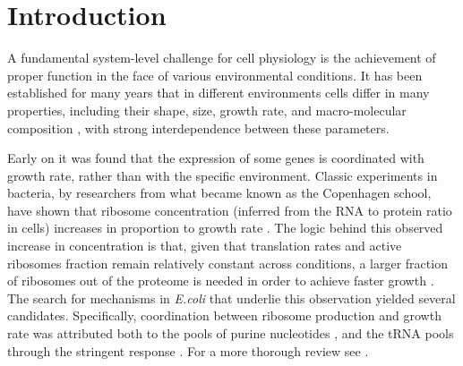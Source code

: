 \section{Introduction}
A fundamental system-level challenge for cell physiology is the achievement of proper function in the face of various environmental conditions.
It has been established for many years that in different environments cells differ in many properties, including their shape, size, growth rate, and macro-molecular composition \cite{Schaechter1958,Maaloe1969,Churchward1982,Pedersen1978a,ingraham1983growth,Bremer1987}, with strong interdependence between these parameters.


Early on it was found that the expression of some genes is coordinated with growth rate, rather than with the specific environment.
Classic experiments in bacteria, by researchers from what became known as the Copenhagen school, have shown that ribosome concentration (inferred from the RNA to protein ratio in cells) increases in proportion to growth rate \cite{Schaechter1958}.
The logic behind this observed increase in concentration is that, given that translation rates and active ribosomes fraction remain relatively constant across conditions, a larger fraction of ribosomes out of the proteome is needed in order to achieve faster growth \cite{Neidhardt1999,Dennis2004,Zaslaver2009}. The search for mechanisms in \emph{E.coli} that underlie this observation yielded several candidates.
Specifically, coordination between ribosome production and growth rate was attributed both to the pools of purine nucleotides \cite{Gourse1996,Gaal1997}, and the tRNA pools through the stringent response \cite{Chatterji2001,Brauer2008a}.
For a more thorough review see \cite{Nomura1984}.



